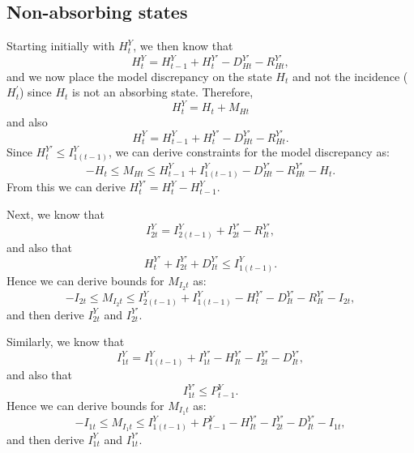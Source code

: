 \documentclass[a4paper]{article}
\begin{document}
\subsection{Non-absorbing states}

Starting initially with $H^Y_t$, we then know that
\begin{equation*}
    H^Y_t = H^Y_{t - 1} + H^{Y\prime}_t - D^{Y\prime}_{Ht} - R^{Y\prime}_{Ht},
\end{equation*}
and we now place the model discrepancy on the state $H_t$ and not the incidence ($H^\prime_t$) since $H_t$ is not an absorbing state. Therefore, 
\begin{equation*}
    H^Y_t = H_t + M_{Ht}
\end{equation*}
and also
\begin{equation*}
    H^Y_t = H^Y_{t - 1} + H^{Y\prime}_t - D^{Y\prime}_{Ht} - R^{Y\prime}_{Ht}.
\end{equation*}
Since $H^{Y\prime}_t \leq I^Y_{1(t - 1)}$, we can derive constraints for the model discrepancy as:
\begin{equation*}
    -H_t \leq M_{Ht} \leq H^Y_{t - 1} + I^Y_{1(t - 1)} - D^{Y\prime}_{Ht} - R^{Y\prime}_{Ht} - H_t.
\end{equation*}
From this we can derive $H^{Y\prime}_t = H^Y_t - H^Y_{t - 1}$.

Next, we know that
\begin{equation*}
    I^Y_{2t} = I^Y_{2(t - 1)} + I^{Y\prime}_{2t} - R^{Y\prime}_{It},
\end{equation*}
and also that
\begin{equation*}
    H^{Y\prime}_t + I^{Y\prime}_{2t} + D^{Y\prime}_{It} \leq I^Y_{1(t - 1)}.
\end{equation*}
Hence we can derive bounds for $M_{I_2t}$ as:
\begin{equation*}
    -I_{2t} \leq M_{I_2t} \leq I^Y_{2(t - 1)} + I^Y_{1(t - 1)} - H^{Y\prime}_{t} - D^{Y\prime}_{It} - R^{Y\prime}_{It} - I_{2t},
\end{equation*}
and then derive $I^Y_{2t}$ and $I^{Y\prime}_{2t}$.

Similarly, we know that
\begin{equation*}
    I^Y_{1t} = I^Y_{1(t - 1)} + I^{Y\prime}_{1t} - H^{Y\prime}_{It} - I^{Y\prime}_{2t} - D^{Y\prime}_{It},
\end{equation*}
and also that
\begin{equation*}
    I^{Y\prime}_{1t} \leq P^Y_{t - 1}.
\end{equation*}
Hence we can derive bounds for $M_{I_1t}$ as:
\begin{equation*}
    -I_{1t} \leq M_{I_1t} \leq I^Y_{1(t - 1)} + P^Y_{t - 1} - H^{Y\prime}_{It} - I^{Y\prime}_{2t} - D^{Y\prime}_{It} - I_{1t},
\end{equation*}
and then derive $I^Y_{1t}$ and $I^{Y\prime}_{1t}$.
\end{document}
